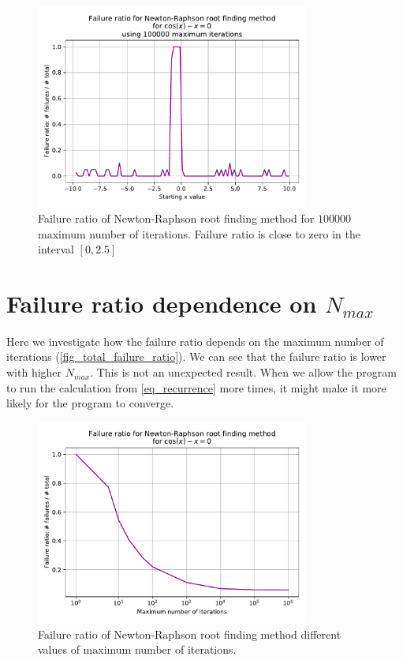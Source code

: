 \begin{figure}[H]
  \centering
  \includegraphics[width=0.8\textwidth]{figures/plot_max_iterations_100000.pdf}
  \caption{Failure ratio of Newton-Raphson root finding method for $\num{100000}$ maximum number of iterations. Failure ratio is close to zero in the interval $[0, 2.5]$}
  \label{fig_fail_rates_max_iterations_100000}
\end{figure}

\section{Failure ratio dependence on $N_{max}$}

Here we investigate how the failure ratio depends on the maximum number of iterations (\autoref{fig_total_failure_ratio}). We can see that the failure ratio is lower with higher $N_{max}$. This is not an unexpected result. When we allow the program to run the calculation from \autoref{eq_recurrence} more times, it might make it more likely for the program to converge.
\begin{figure}[H]
  \centering
  \includegraphics[width=0.8\textwidth]{figures/total_failure_ratio.pdf}
  \caption{Failure ratio of Newton-Raphson root finding method different values of maximum number of iterations.}
  \label{fig_total_failure_ratio}
\end{figure}

